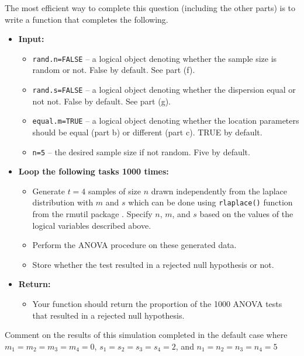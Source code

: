 \documentclass{article}\usepackage[]{graphicx}\usepackage[]{color}
\begin{document}
\begin{enumerate}
\begin{enumerate}
  The most efficient way to complete this question (including the other parts)
  is to write a function that completes the following. 
  \begin{itemize}
    \item \textbf{Input:} 
    \begin{itemize}
      \item \texttt{rand.n=FALSE} -- a logical object denoting whether the sample
                                     size is random or not. False by default.
                                     See part (f).
      \item \texttt{rand.s=FALSE} -- a logical object denoting whether the dispersion
                                     equal or not not. False by default. See part (g).
      \item \texttt{equal.m=TRUE} -- a logical object denoting whether the location
                                     parameters should be equal (part b) or different 
                                     (part c). TRUE by default. 
      \item \texttt{n=5} -- the desired sample size if not random. Five by default.
    \end{itemize}
    \item \textbf{Loop the following tasks 1000 times:}
    \begin{itemize}
      \item Generate $t=4$ samples of size $n$ drawn independently from the 
        laplace distribution with $m$ and $s$ which can be done using 
        \texttt{rlaplace()} function from the rmutil package \citep{rmutil}. Specify
        $n$, $m$, and $s$ based on the values of the
        logical variables described above.
      \item Perform the ANOVA procedure on these generated data.
      \item Store whether the test resulted in a rejected null hypothesis or not.
    \end{itemize}
    \item \textbf{Return:}
    \begin{itemize}
      \item Your function should return the proportion of the 1000 ANOVA tests
      that resulted in a rejected null hypothesis.
    \end{itemize}
  \end{itemize}
    Comment on the results of this simulation completed in the default case where
  $m_1=m_2=m_3=m_4=0$, $s_1=s_2=s_3=s_4=2$, and $n_1=n_2=n_3=n_4=5$
  

\end{enumerate}
\end{enumerate}
\end{document}
